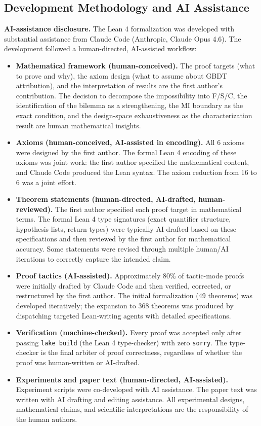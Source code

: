 \documentclass{article}
\begin{document}
\subsection{Development Methodology and AI Assistance}
\label{sec:ai-disclosure}

\textbf{AI-assistance disclosure.} The Lean 4 formalization was developed with substantial assistance from Claude Code (Anthropic, Claude Opus 4.6). The development followed a human-directed, AI-assisted workflow:

\begin{itemize}
\item \textbf{Mathematical framework (human-conceived).} The proof targets (what to prove and why), the axiom design (what to assume about GBDT attribution), and the interpretation of results are the first author's contribution. The decision to decompose the impossibility into F/S/C, the identification of the bilemma as a strengthening, the MI boundary as the exact condition, and the design-space exhaustiveness as the characterization result are human mathematical insights.

\item \textbf{Axioms (human-conceived, AI-assisted in encoding).} All 6 axioms were designed by the first author. The formal Lean 4 encoding of these axioms was joint work: the first author specified the mathematical content, and Claude Code produced the Lean syntax. The axiom reduction from 16 to 6 was a joint effort.

\item \textbf{Theorem statements (human-directed, AI-drafted, human-reviewed).} The first author specified each proof target in mathematical terms. The formal Lean 4 type signatures (exact quantifier structure, hypothesis lists, return types) were typically AI-drafted based on these specifications and then reviewed by the first author for mathematical accuracy. Some statements were revised through multiple human/AI iterations to correctly capture the intended claim.

\item \textbf{Proof tactics (AI-assisted).} Approximately 80\% of tactic-mode proofs were initially drafted by Claude Code and then verified, corrected, or restructured by the first author. The initial formalization (49 theorems) was developed iteratively; the expansion to 368 theorems was produced by dispatching targeted Lean-writing agents with detailed specifications.

\item \textbf{Verification (machine-checked).} Every proof was accepted only after passing \texttt{lake build} (the Lean 4 type-checker) with zero \texttt{sorry}. The type-checker is the final arbiter of proof correctness, regardless of whether the proof was human-written or AI-drafted.

\item \textbf{Experiments and paper text (human-directed, AI-assisted).} Experiment scripts were co-developed with AI assistance. The paper text was written with AI drafting and editing assistance. All experimental designs, mathematical claims, and scientific interpretations are the responsibility of the human authors.
\end{itemize}
\end{document}
